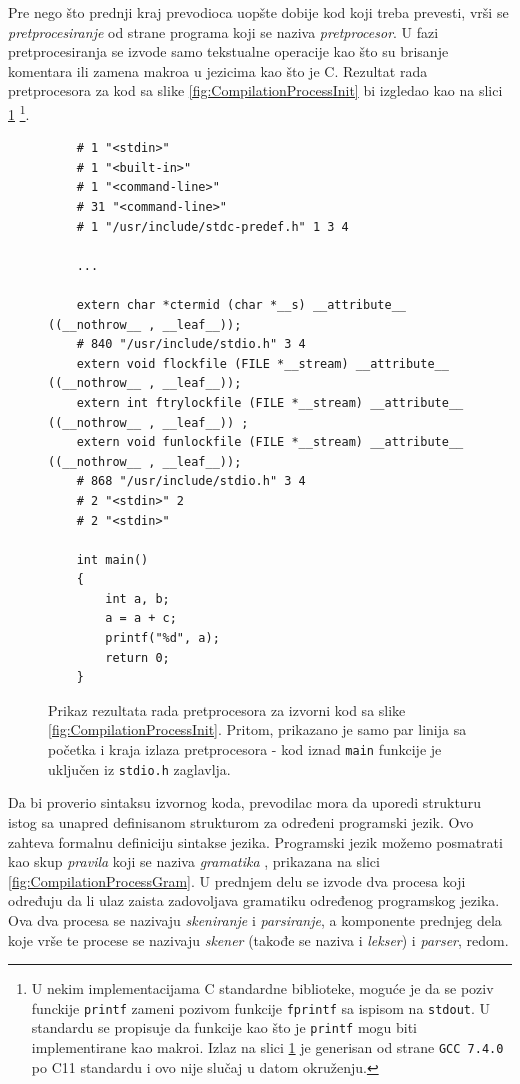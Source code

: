 Pre nego što prednji kraj prevodioca uopšte dobije kod koji treba prevesti, vrši se \emph{pretprocesiranje} od strane programa koji se naziva \emph{pretprocesor}. U fazi pretprocesiranja se izvode samo tekstualne operacije kao što su brisanje komentara ili zamena makroa u jezicima kao što je C. Rezultat rada pretprocesora za kod sa slike \ref{fig:CompilationProcessInit} bi izgledao kao na slici \ref{fig:CompilationProcessPrep} 
\footnote{U nekim implementacijama C standardne biblioteke, moguće je da se poziv funckije \texttt{printf} zameni pozivom funkcije \texttt{fprintf}
sa ispisom na \texttt{stdout}. U standardu se propisuje da funkcije kao što je \texttt{printf} mogu biti implementirane kao makroi. Izlaz 
na slici \ref{fig:CompilationProcessPrep} je generisan od strane \texttt{GCC 7.4.0} po C11 standardu i ovo nije slučaj u datom okruženju.}.

\begin{figure}[h!]
    \begin{lstlisting}
    # 1 "<stdin>"
    # 1 "<built-in>"
    # 1 "<command-line>"
    # 31 "<command-line>"
    # 1 "/usr/include/stdc-predef.h" 1 3 4

    ...

    extern char *ctermid (char *__s) __attribute__ ((__nothrow__ , __leaf__));
    # 840 "/usr/include/stdio.h" 3 4
    extern void flockfile (FILE *__stream) __attribute__ ((__nothrow__ , __leaf__));
    extern int ftrylockfile (FILE *__stream) __attribute__ ((__nothrow__ , __leaf__)) ;
    extern void funlockfile (FILE *__stream) __attribute__ ((__nothrow__ , __leaf__));
    # 868 "/usr/include/stdio.h" 3 4
    # 2 "<stdin>" 2
    # 2 "<stdin>"

    int main()
    {
        int a, b;
        a = a + c;
        printf("%d", a);
        return 0;
    }
    \end{lstlisting}
    \caption{Prikaz rezultata rada pretprocesora za izvorni kod sa slike \ref{fig:CompilationProcessInit}. Pritom, prikazano je samo par linija sa početka i kraja izlaza pretprocesora - kod iznad \texttt{main} funkcije je uključen iz \texttt{stdio.h} zaglavlja.}
    \label{fig:CompilationProcessPrep}
\end{figure}

Da bi proverio sintaksu izvornog koda, prevodilac mora da uporedi strukturu istog sa unapred definisanom strukturom za određeni programski jezik. Ovo zahteva formalnu definiciju sintakse jezika. Programski jezik možemo posmatrati kao skup \emph{pravila} koji se naziva \emph{gramatika} \cite{ContextFreeGrammars}, prikazana na slici \ref{fig:CompilationProcessGram}. U prednjem delu se izvode dva procesa koji određuju da li ulaz zaista zadovoljava gramatiku određenog programskog jezika. Ova dva procesa se nazivaju \emph{skeniranje} i \emph{parsiranje}, a komponente prednjeg dela koje vrše te procese se nazivaju \emph{skener} (takođe se naziva i \emph{lekser}) i \emph{parser}, redom.

